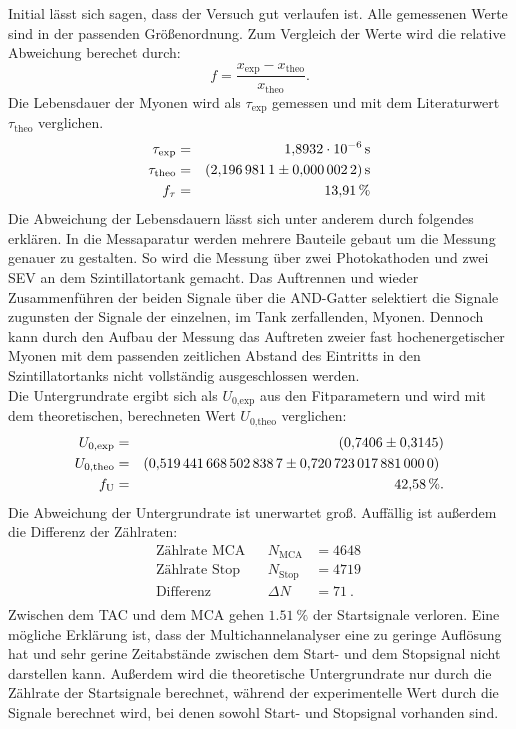 Initial lässt sich sagen, dass der Versuch gut verlaufen ist.
Alle gemessenen Werte sind in der passenden Größenordnung.
Zum Vergleich der Werte wird die relative Abweichung berechet durch:
\begin{equation*}
  f=\frac{x_{\text{exp}}-x_{\text{theo}}}{x_{\text{theo}}}.
\end{equation*}
Die Lebensdauer der Myonen wird als $\tau_{\text{exp}}$ gemessen und mit dem Literaturwert $\tau_{\text{theo}}$ \cite{PDG} verglichen.
\begin{align*}
  \tau_{\text{exp}}   &=&   \SI{1.8932e-06}{s}  \\
  \tau_{\text{theo}}  &=&   \SI{2.1969811 \pm 0.0000022}{s}   \\
  f_{\tau}            &=&   \SI{13.91}{\%}      \\
\end{align*}
Die Abweichung der Lebensdauern lässt sich unter anderem durch folgendes erklären.
In die Messaparatur werden mehrere Bauteile gebaut um die Messung genauer zu gestalten.
So wird die Messung über zwei Photokathoden und zwei SEV an dem Szintillatortank gemacht.
Das Auftrennen und wieder Zusammenführen der beiden Signale über die AND-Gatter selektiert die Signale zugunsten der Signale der einzelnen, im Tank zerfallenden, Myonen.
Dennoch kann durch den Aufbau der Messung das Auftreten zweier fast hochenergetischer Myonen mit dem passenden zeitlichen Abstand des Eintritts in den Szintillatortanks nicht vollständig ausgeschlossen werden.\\
Die Untergrundrate ergibt sich als $U_{\text{0,exp}}$ aus den Fitparametern und wird mit dem theoretischen, berechneten Wert $U_{\text{0,theo}}$ verglichen:
\begin{align*}
  U_{\text{0,exp}}    &=&  \SI{0.7406 \pm 0.3145}{} \\
  U_{\text{0,theo}}   &=&  \SI{0.5194416685028387 \pm 0.720723017881}{}   \\
  f_{\text{U}}        &=&  \SI{42.58}{\%}. \\
\end{align*}
Die Abweichung der Untergrundrate ist unerwartet groß.
Auffällig ist außerdem die Differenz der Zählraten:
\begin{align*}
  \text{Zählrate MCA}      && N_{\text{MCA}}    &=\SI{4648}{} \\
  \text{Zählrate Stop}     && N_{\text{Stop}}   &=\SI{4719}{} \\
  \text{Differenz}         && \Delta N          &=\SI{71}{}.\\
\end{align*}
Zwischen dem TAC und dem MCA gehen $\SI{1.51}{\%}$ der Startsignale verloren.
Eine mögliche Erklärung ist, dass der Multichannelanalyser eine zu geringe Auflösung hat und sehr gerine Zeitabstände zwischen dem Start- und dem Stopsignal nicht darstellen kann.
Außerdem wird die theoretische Untergrundrate nur durch die Zählrate der Startsignale berechnet, während der experimentelle Wert durch die Signale berechnet wird, bei denen sowohl Start- und Stopsignal vorhanden sind.

